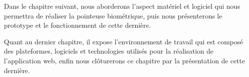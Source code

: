 Dans le chapitre suivant, nous aborderons l’aspect matériel et logiciel qui nous permettra de réaliser la pointeuse biométrique, puis nous présenterons le prototype et le fonctionnement de cette dernière.
\clearpage

Quant au dernier chapitre, il expose l’environnement de travail qui est composé des plateformes, logiciels et technologies utilisés pour la réalisation de l’application web, enfin nous clôturerons ce chapitre par la présentation de cette dernière.
    
    
